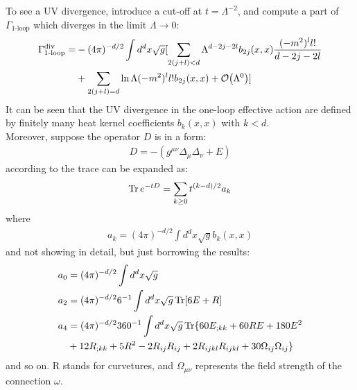To see a UV divergence, introduce a cut-off at $t=\Lambda ^{-2}$, and compute a part of $\Gamma _{\text{1-loop}}$ which diverges in the limit $\Lambda \to 0$:
\begin{align}
    \begin{split}
    \Gamma _{\text{1-loop}} ^{\text{div}} =&  -(4\pi)^{-d/2} \int d^{d} x \sqrt{g} [ \sum_{2(j+l)< d} \Lambda ^{d-2j-2l} b_{2j}(x,x) \frac{(-m^{2})^{l} l!} {d-2j-2l}  \\
    &+ \sum_{2(j+l) =d} \ln \Lambda (-m^{2})^{l} l! b_{2j} (x,x) + \order {\Lambda ^{0}} ] 
    \end{split}
\end{align}
It can be seen that the UV divergence in the one-loop effective action are defined by finitely many heat kernel coefficients $b_{k} (x,x)$ with $k<d$. \\
\indent Moreover, suppose the operator $D$ is in a form:
\begin{align}
    D = -(g^{\mu \nu} \Delta _{\mu} \Delta _{\nu} + E)
\end{align}
according to %
the trace can be expanded as:
\begin{align}
    \Tr e^{-tD} = \sum _{k \ge 0} t^{(k-d)/2} a_{k}
\end{align}
where
\begin{align}
    a_k = (4\pi)^{-d/2} \int d^{d}x \sqrt{g} b_{k}(x,x)
\end{align}
and not showing in detail, but just borrowing the results:
\begin{align}
    a_{0} &= (4\pi)^{-d/2} \int d^{d} x \sqrt{g} \\
    a_{2} &= (4\pi)^{-d/2} 6^{-1} \int d^{d} x \sqrt{g} \Tr [6E + R] \\
    a_{4} &= (4\pi)^{-d/2} 360 ^{-1} \int d^{d}x \sqrt{g} \Tr \lbrace 60E_{;kk} + 60RE + 180 E^2 \nonumber  \\
    & + 12 R_{;kk} + 5R^{2} -2R_{ij}R_{ij} + 2R_{ijkl}R_{ijkl} + 30 \Omega _{ij} \Omega _{ij}\rbrace
\end{align}
and so on. R stands for curvetures, and $\Omega _{\mu \nu}$ represents the field strength of the connection $\omega$. 

